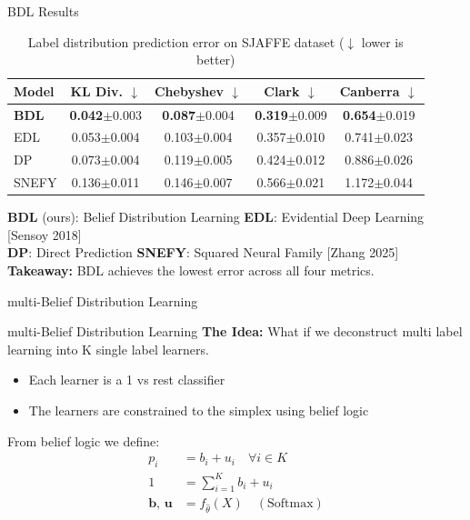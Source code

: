 \documentclass[aspectratio=169]{beamer}
\begin{document}
\begin{frame}{BDL Results}
    \begin{table}
        \centering
        \caption{Label distribution prediction error on SJAFFE  dataset ($\downarrow$ lower is better)}
        \label{tab:sjaffe_accuracy}
        \begin{tabular}{lcccc}
            \toprule
            \textbf{Model} & \textbf{KL Div.} $\downarrow$ & \textbf{Chebyshev} $\downarrow$ & \textbf{Clark} $\downarrow$ & \textbf{Canberra} $\downarrow$\\
            \midrule
            \textbf{BDL}      & \textbf{0.042}$\pm$0.003 & \textbf{0.087}$\pm$0.004 & \textbf{0.319}$\pm$0.009 & \textbf{0.654}$\pm$0.019 \\
            EDL               & 0.053$\pm$0.004 & 0.103$\pm$0.004 & 0.357$\pm$0.010 & 0.741$\pm$0.023 \\
            DP & 0.073$\pm$0.004 & 0.119$\pm$0.005 & 0.424$\pm$0.012 & 0.886$\pm$0.026 \\
            SNEFY             & 0.136$\pm$0.011 & 0.146$\pm$0.007 & 0.566$\pm$0.021 & 1.172$\pm$0.044 \\
            \bottomrule
        \end{tabular}
    \end{table}
    
    \footnotesize
    \textbf{BDL} (ours): Belief Distribution Learning \quad
    \textbf{EDL}: Evidential Deep Learning [Sensoy 2018] \\
    \textbf{DP}: Direct Prediction \quad
    \textbf{SNEFY}: Squared Neural Family [Zhang 2025] \\
    
    \vspace{0.5em}
    \normalsize
    \textbf{Takeaway:} BDL achieves the lowest error across all four metrics.
\end{frame}
\begin{frame}[T]
    \vfill
    \centering
    {\Large multi-Belief Distribution Learning\par}
    \vfill
\end{frame}

\begin{frame}[t]{multi-Belief Distribution Learning}
    \textbf{The Idea:} What if we deconstruct multi label learning into K single label learners.
    \begin{itemize}
        \item Each learner is a 1 vs rest classifier
        \item The learners are constrained to the simplex using belief logic
    \end{itemize}
    \vspace{1em}
    From belief logic we define:
    \begin{align}
        p_i &= b_i + u_i \quad \forall i \in K \\
        1 &= \sum_{i=1}^K b_i + u_i\\
        \textbf{b, u} &= f_{\hat\theta}(X) \quad \left(\text{Softmax}\right)
    \end{align}
\end{frame}
\end{document}

